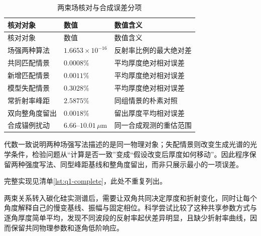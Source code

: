 \begingroup
\fontsize{8}{9}\selectfont
\renewcommand{\arraystretch}{1.00}
\setlength{\LTpre}{2pt}
\setlength{\LTpost}{2pt}
\begin{longtable}{>{\centering\arraybackslash}p{}>{\centering\arraybackslash}p{}>{\centering\arraybackslash}p{}}
\caption{两束场核对与合成误差分项}\label{tab:app-q1}\\
\toprule
核对对象 & 数值 & 数值含义 \\
\midrule
\endfirsthead
\toprule
核对对象 & 数值 & 数值含义 \\
\midrule
\endhead
\bottomrule
\endfoot
场强两种算法 & $1.6653\times10^{-16}$ & 反射率比例的最大绝对差 \\*
共同匹配情景 & $0.0008\%$ & 平均厚度绝对相对误差 \\*
新增匹配情景 & $0.0011\%$ & 平均厚度绝对相对误差 \\*
模型失配情景 & $0.3028\%$ & 平均厚度绝对相对误差 \\*
常折射率峰距 & $2.5875\%$ & 同组情景的朴素对照 \\*
双向整角度留出 & $0.0018\%$ & 留出厚度平均相对误差 \\*
合成锚例扰动 & $6.66$--$10.01\,\mu\mathrm{m}$ & 同一合成观测的重估范围 \\
\end{longtable}
\endgroup

代数一致说明两种场强写法描述的是同一物理对象；失配情景则改变生成光谱的光学条件，检验问题从“计算是否一致”变成“假设改变后厚度如何移动”。因此程序保留两种强度写法、同型峰距基线和整角度留出，而非只展示最小的一项误差。

\begingroup
{}
完整实现见清单\ref{lst:q1-complete}，此处不重复列出。
\endgroup

两束关系转入碳化硅实测谱后，需要让双角共同决定厚度和折射变化，同时让每个角度解释自己的慢变基线、振幅与固定相位。科学尝试比较了这种共享参数方式与逐角厚度简单平均，发现不同波段的反射率起伏差异明显，且缺少折射率曲线，因而保留共同物理参数和逐角低阶响应。

